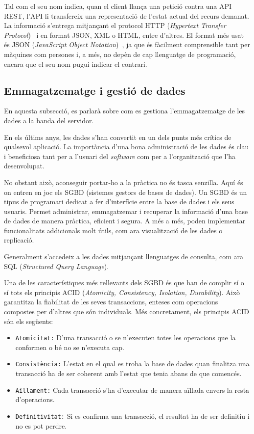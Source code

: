 \documentclass[a4paper,12pt]{ThesisStyle}
\begin{document}
Tal com el seu nom indica, quan el client llança una petició contra una API REST, l'API li transfereix una representació de l'estat actual del recurs demanat. La informació s'entrega mitjançant el protocol HTTP (\textit{Hypertext Transfer Protocol})~\cite{HTTP} i en format JSON, XML o HTML, entre d'altres. El format més usat és JSON (\textit{JavaScript Object Notation})~\cite{JSON}, ja que és fàcilment comprensible tant per màquines com persones i, a més, no depèn de cap llenguatge de programació, encara que el seu nom pugui indicar el contrari.

\subsection{Emmagatzematge i gestió de dades}

En aquesta subsecció, es parlarà sobre com es gestiona l'emmagatzematge de les dades a la banda del servidor.

En els últims anys, les dades s'han convertit en un dels punts més crítics de qualsevol aplicació. La importància d'una bona administració de les dades és clau i beneficiosa tant per a l'usuari del \textit{software} com per a l'organització que l'ha desenvolupat.

No obstant això, aconseguir portar-ho a la pràctica no és tasca senzilla. Aquí és on entren en joc els SGBD (sistemes gestors de bases de dades). Un SGBD és un tipus de programari dedicat a fer d'interfície entre la base de dades i els seus usuaris. Permet administrar, emmagatzemar i recuperar la informació d'una base de dades de manera pràctica, eficient i segura. A més a més, poden implementar funcionalitats addicionals molt útils, com ara visualització de les dades o replicació.

Generalment s'accedeix a les dades mitjançant llenguatges de consulta, com ara SQL (\textit{Structured Query Language}).

Una de les característiques més rellevants dels SGBD és que han de complir sí o sí tots els principis ACID (\textit{Atomicity, Consistency, Isolation, Durability}). Això garantitza la fiabilitat de les seves transaccions, enteses com operacions compostes per d'altres que són individuals. Més concretament, els principis ACID són els següents:
\begin{itemize}
  \item \texttt{Atomicitat:} D'una transacció o se n'executen totes les operacions que la conformen o bé no se n'executa cap.
  \item \texttt{Consistència:} L'estat en el qual es troba la base de dades quan finalitza una transacció ha de ser coherent amb l'estat que tenia abans de que comencés.
  \item \texttt{Aïllament:} Cada transacció s'ha d'executar de manera aïllada envers la resta d'operacions.
  \item \texttt{Definitivitat:} Si es confirma una transacció, el resultat ha de ser definitiu i no es pot perdre.
\end{itemize}
\end{document}

